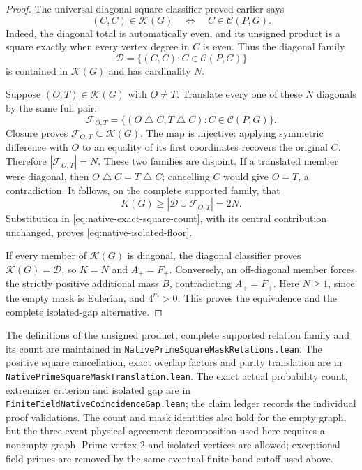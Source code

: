 \documentclass[11pt]{article}
\begin{document}
\begin{proof}
The universal diagonal square classifier proved earlier says
\[
       (C,C)\in\mathcal K(G)
        \quad\Longleftrightarrow\quad C\in\mathcal C(P,G).
\]
Indeed, the diagonal total is automatically even, and its unsigned
product is a square exactly when every vertex degree in \(C\) is even.
Thus the diagonal family
\[
                   \mathcal D=\{(C,C):C\in\mathcal C(P,G)\}
\]
is contained in \(\mathcal K(G)\) and has cardinality \(N\).

Suppose \((O,T)\in\mathcal K(G)\) with \(O\ne T\). Translate every
one of these \(N\) diagonals by the same full pair:
\[
 \mathcal F_{O,T}
   =\{(O\mathbin{\triangle}C,T\mathbin{\triangle}C):
                                  C\in\mathcal C(P,G)\}.
\]
Closure proves \(\mathcal F_{O,T}\subseteq\mathcal K(G)\).
The map is injective: applying symmetric difference with \(O\) to
an equality of its first coordinates recovers the original \(C\).
Therefore \(|\mathcal F_{O,T}|=N\).
These two families are disjoint. If a translated member were diagonal,
then
\(O\mathbin{\triangle}C=T\mathbin{\triangle}C\);
cancelling \(C\) would give \(O=T\), a contradiction.
It follows, on the complete supported family, that
\[
              K(G)\geq|\mathcal D\cup\mathcal F_{O,T}|=2N.
\]
Substitution in \eqref{eq:native-exact-square-count}, with its central
contribution unchanged, proves \eqref{eq:native-isolated-floor}.

If every member of \(\mathcal K(G)\) is diagonal, the diagonal
classifier proves \(\mathcal K(G)=\mathcal D\), so \(K=N\) and
\(A_+=F_+\). Conversely, an off-diagonal member forces the strictly
positive additional mass \(B\), contradicting \(A_+=F_+\).
Here \(N\geq1\), since the empty mask is Eulerian, and \(4^m>0\).
This proves the equivalence and the complete isolated-gap alternative.
\end{proof}

The definitions of the unsigned product, complete supported relation
family and its count are maintained in
\texttt{NativePrimeSquareMaskRelations.lean}.
The positive square cancellation, exact overlap factors and parity
translation are in \texttt{NativePrimeSquareMaskTranslation.lean}.
The exact actual probability count, extremizer criterion and isolated
gap are in \texttt{FiniteFieldNativeCoincidenceGap.lean}; the claim
ledger records the individual proof validations.
The count and mask identities also hold for the empty graph, but the
three-event physical agreement decomposition used here requires a
nonempty graph. Prime vertex \(2\) and isolated vertices are allowed;
exceptional field primes are removed by the same eventual finite-band
cutoff used above.
\end{document}
